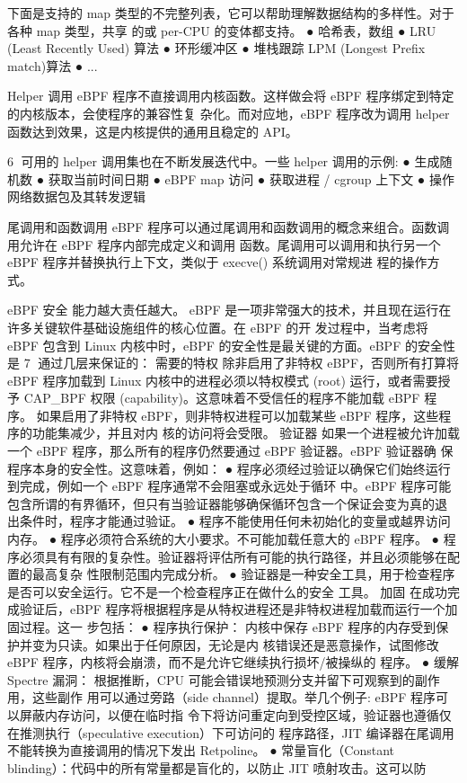 下面是支持的 map 类型的不完整列表，它可以帮助理解数据结构的多样性。对于各种 map 类型，共享
的或 per-CPU 的变体都支持。
 ● 哈希表，数组
 ● LRU (Least Recently Used) 算法
 ● 环形缓冲区
 ● 堆栈跟踪 LPM (Longest Prefix match)算法
 ● ...



Helper 调用
eBPF 程序不直接调用内核函数。这样做会将 eBPF 程序绑定到特定的内核版本，会使程序的兼容性复
杂化。而对应地，eBPF 程序改为调用 helper 函数达到效果，这是内核提供的通用且稳定的 API。



                                                         6
可用的 helper 调用集也在不断发展迭代中。一些 helper 调用的示例:
 ● 生成随机数
 ● 获取当前时间日期
 ● eBPF map 访问
 ● 获取进程 / cgroup 上下文
 ● 操作网络数据包及其转发逻辑



尾调用和函数调用
eBPF 程序可以通过尾调用和函数调用的概念来组合。函数调用允许在 eBPF 程序内部完成定义和调用
函数。尾调用可以调用和执行另一个 eBPF 程序并替换执行上下文，类似于 execve() 系统调用对常规进
程的操作方式。




eBPF 安全
能力越大责任越大。
eBPF 是一项非常强大的技术，并且现在运行在许多关键软件基础设施组件的核心位置。在 eBPF 的开
发过程中，当考虑将 eBPF 包含到 Linux 内核中时，eBPF 的安全性是最关键的方面。eBPF 的安全性是
                                                        7
通过几层来保证的：
需要的特权
除非启用了非特权 eBPF，否则所有打算将 eBPF 程序加载到 Linux 内核中的进程必须以特权模式
(root) 运行，或者需要授予 CAP_BPF 权限 (capability)。这意味着不受信任的程序不能加载 eBPF 程
序。
如果启用了非特权 eBPF，则非特权进程可以加载某些 eBPF 程序，这些程序的功能集减少，并且对内
核的访问将会受限。
验证器
如果一个进程被允许加载一个 eBPF 程序，那么所有的程序仍然要通过 eBPF 验证器。eBPF 验证器确
保程序本身的安全性。这意味着，例如：
 ● 程序必须经过验证以确保它们始终运行到完成，例如一个 eBPF 程序通常不会阻塞或永远处于循环
   中。eBPF 程序可能包含所谓的有界循环，但只有当验证器能够确保循环包含一个保证会变为真的退
   出条件时，程序才能通过验证。
 ● 程序不能使用任何未初始化的变量或越界访问内存。
 ● 程序必须符合系统的大小要求。不可能加载任意大的 eBPF 程序。
 ● 程序必须具有有限的复杂性。验证器将评估所有可能的执行路径，并且必须能够在配置的最高复杂
   性限制范围内完成分析。
 ● 验证器是一种安全工具，用于检查程序是否可以安全运行。它不是一个检查程序正在做什么的安全
   工具。
加固
在成功完成验证后，eBPF 程序将根据程序是从特权进程还是非特权进程加载而运行一个加固过程。这一
步包括：
 ● 程序执行保护： 内核中保存 eBPF 程序的内存受到保护并变为只读。如果出于任何原因，无论是内
   核错误还是恶意操作，试图修改 eBPF 程序，内核将会崩溃，而不是允许它继续执行损坏/被操纵的
   程序。
 ● 缓解 Spectre 漏洞： 根据推断，CPU 可能会错误地预测分支并留下可观察到的副作用，这些副作
   用可以通过旁路（side channel）提取。举几个例子: eBPF 程序可以屏蔽内存访问，以便在临时指
   令下将访问重定向到受控区域，验证器也遵循仅在推测执行（speculative execution）下可访问的
   程序路径，JIT 编译器在尾调用不能转换为直接调用的情况下发出 Retpoline。
 ● 常量盲化（Constant blinding）：代码中的所有常量都是盲化的，以防止 JIT 喷射攻击。这可以防


